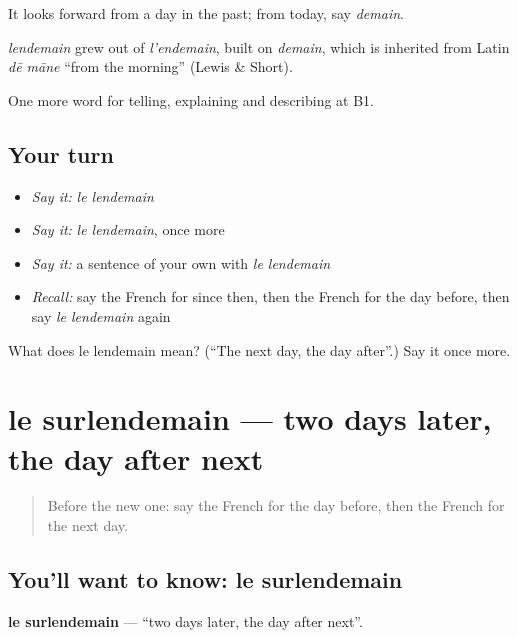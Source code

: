 It looks forward from a day in the past; from today, say \emph{demain}.

\begin{cousinweb}
\emph{lendemain} grew out of \emph{l'endemain}, built on \emph{demain}, which is inherited from Latin \emph{dē māne} \textquotedblleft{}from the morning\textquotedblright{} (Lewis \& Short).
\end{cousinweb}

\begin{grammarlens}[title={What you've built}]
One more word for telling, explaining and describing at B1.
\end{grammarlens}

\subsection*{Your turn}
\begin{itemize}
\raggedright
  \item \emph{Say it:} \emph{le lendemain}
  \item \emph{Say it:} \emph{le lendemain}, once more
  \item \emph{Say it:} a sentence of your own with \emph{le lendemain}
  \item \emph{Recall:} say the French for since then, then the French for the day before, then say \emph{le lendemain} again
\end{itemize}

\begin{tcolorbox}[breakable,colback=teal!4,colframe=teal!35!black,title={Before you move on}]
What does le lendemain mean? (\textquotedblleft{}The next day, the day after\textquotedblright{}.) Say it once more.
\end{tcolorbox}
\section[le surlendemain]{le surlendemain — two days later, the day after next}

\label{lesson:FR-C273-surlendemain}



\begin{quote}
Before the new one: say the French for the day before, then the French for the next day.
\end{quote}

\subsection*{You'll want to know: le surlendemain}
\textbf{le surlendemain} — \textquotedblleft{}two days later, the day after next\textquotedblright{}.

